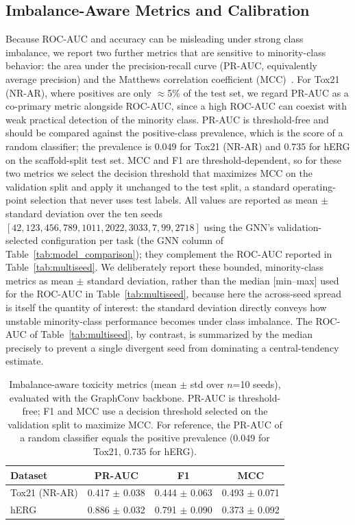 \documentclass[journal]{IEEEtran}
\begin{document}
\subsection{Imbalance-Aware Metrics and Calibration}
\label{sec:imbalance_metrics}

Because ROC-AUC and accuracy can be misleading under strong class imbalance, we report two further metrics that are sensitive to minority-class behavior: the area under the precision-recall curve (PR-AUC, equivalently average precision) and the Matthews correlation coefficient (MCC)~\cite{chicco2020mcc}. For Tox21 (NR-AR), where positives are only $\approx$5\% of the test set, we regard PR-AUC as a co-primary metric alongside ROC-AUC, since a high ROC-AUC can coexist with weak practical detection of the minority class. PR-AUC is threshold-free and should be compared against the positive-class prevalence, which is the score of a random classifier; the prevalence is $0.049$ for Tox21 (NR-AR) and $0.735$ for hERG on the scaffold-split test set. MCC and F1 are threshold-dependent, so for these two metrics we select the decision threshold that maximizes MCC on the validation split and apply it unchanged to the test split, a standard operating-point selection that never uses test labels. All values are reported as mean $\pm$ standard deviation over the ten seeds $[42, 123, 456, 789, 1011, 2022, 3033, 7, 99, 2718]$ using the GNN's validation-selected configuration per task (the GNN column of Table~\ref{tab:model_comparison}); they complement the ROC-AUC reported in Table~\ref{tab:multiseed}. We deliberately report these bounded, minority-class metrics as mean $\pm$ standard deviation, rather than the median [min--max] used for the ROC-AUC in Table~\ref{tab:multiseed}, because here the across-seed spread is itself the quantity of interest: the standard deviation directly conveys how unstable minority-class performance becomes under class imbalance. The ROC-AUC of Table~\ref{tab:multiseed}, by contrast, is summarized by the median precisely to prevent a single divergent seed from dominating a central-tendency estimate.

\begin{table}[!t]
\centering
\caption{Imbalance-aware toxicity metrics (mean $\pm$ std over $n$=10 seeds), evaluated with the GraphConv backbone. PR-AUC is threshold-free; F1 and MCC use a decision threshold selected on the validation split to maximize MCC. For reference, the PR-AUC of a random classifier equals the positive prevalence (0.049 for Tox21, 0.735 for hERG).}
\label{tab:imbalance_metrics}
\small
\setlength{\tabcolsep}{4pt}
\begin{tabular}{lccc}
\toprule
\textbf{Dataset} & \textbf{PR-AUC} & \textbf{F1} & \textbf{MCC} \\
\midrule
Tox21 (NR-AR) & 0.417 $\pm$ 0.038 & 0.444 $\pm$ 0.063 & 0.493 $\pm$ 0.071 \\
hERG & 0.886 $\pm$ 0.032 & 0.791 $\pm$ 0.090 & 0.373 $\pm$ 0.092 \\
\bottomrule
\end{tabular}
\end{table}
\end{document}
